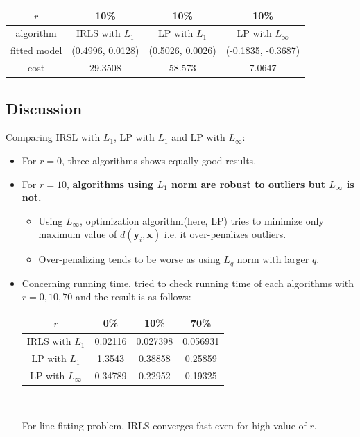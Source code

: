 \documentclass[paper=a4, fontsize=11pt]{scrartcl} %
\numberwithin{equation}{section} %
\numberwithin{figure}{section} %
\numberwithin{table}{section} %
\renewcommand{\vec}[1]{\mathbf{#1}}
\begin{document}
\begin{center}
    \begin{tabular}{ | c | c | c | c |}
    \hline
    $r$			&	10\%				&	10\%				&	10\%				 \\ \hline
    algorithm		&	IRLS	 with $L_{1}$	&	LP	 with $L_{1}$	&	LP with $L_{\infty}$		\\ \hline	
    fitted model		&	(0.4996, 0.0128) 	& 	(0.5026, 0.0026) 	& 	(-0.1835, -0.3687)	\\ \hline
    cost 			& 	29.3508			& 	58.573 			& 	7.0647			 \\ \hline
    \end{tabular}
\end{center} 


\subsection{Discussion}

Comparing IRSL with $L_{1}$, LP with $L_{1}$ and LP with $L_{\infty}$:

\begin{itemize}
\item For $r = 0$, three algorithms shows equally good results. 
\item For $r = 10$, \textbf{algorithms using $L_{1}$ norm are robust to outliers but $L_{\infty}$ is not.}
	\begin{itemize}
		\item Using $L_{\infty}$, optimization algorithm(here, LP) tries to minimize only maximum value of $d(\vec{y}_{i}, \vec{x})$ i.e. it over-penalizes outliers.
		\item Over-penalizing tends to be worse as using $L_{q}$ norm with larger $q$.
	\end{itemize} 
\item Concerning running time, tried to check running time of each algorithms with $r = 0, 10, 70$ and the result is as follows:

\begin{center}
    \begin{tabular}{ | c | c | c | c |}
    \hline
    $r$				&	0\%				&	10\%				&	70\%				 \\ \hline
    IRLS with $L_{1}$		&	0.02116			&	0.027398			&	0.056931		\\ \hline	
    LP	 with $L_{1}$		&	1.3543 			& 	0.38858		 	& 	0.25859		\\ \hline
    LP with $L_{\infty}$ 	& 	0.34789			& 	0.22952 			& 	0.19325		 \\ \hline
    \end{tabular} \\
\end{center}  

    For line fitting problem, IRLS converges fast even for high value of $r$.
\end{itemize}


\end{document}
